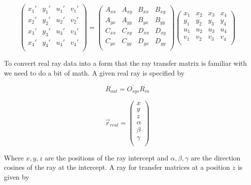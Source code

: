 \documentclass{article}
\begin{document}
	\begin{equation}
		\begin{pmatrix}
			x_1' & y_1' & u_1' & v_1' \\
			x_2' & y_2' & u_2' & v_2' \\
			x_3' & y_3' & u_3' & v_3' \\
			x_4' & y_4' & u_4' & v_4' \\
		\end{pmatrix}
		=
		\begin{pmatrix}
			A_{xx} & A_{xy} & B_{xx} & B_{xy} \\
			A_{yx} & A_{yy} & B_{yx} & B_{yy} \\
			C_{xx} & C_{xy} & D_{xx} & D_{xy} \\
			C_{yx} & C_{yy} & D_{yx} & D_{yy} \\
		\end{pmatrix}
		\begin{pmatrix}
			x_1 & x_2 & x_3 & x_4 \\
			y_1 & y_2 & y_3 & y_4 \\
			u_1 & u_2 & u_3 & u_4 \\
			v_1 & v_2 & v_3 & v_4 \\
		\end{pmatrix}
	\end{equation}
	
	To convert real ray data into a form that the ray transfer matrix is familiar with we need to do a bit of math. A given real ray is specified by
	
	\begin{equation}
		\overline{R_{out}} = \overline{O_{sys}}\overline{R_{in}}
	\end{equation}
	
	\begin{equation}
		\vec{r}_{real} = 
		\begin{pmatrix}
			x \\
			y \\
			z \\
			\alpha \\
			\beta \\
			\gamma \\
		\end{pmatrix}
	\end{equation}
	
	Where $x,y,z$ are the positions of the ray intercept and $\alpha,\beta,\gamma$ are the direction cosines of the ray at the intercept. A ray for transfer matrices at a position $z$ is given by 
	
\end{document}
